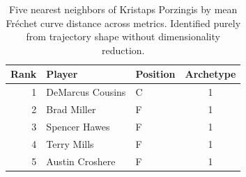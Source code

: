 \begin{table}[htbp]
  \centering\small
  \begin{tabular}{rllc}
    \toprule
    Rank & Player & Position & Archetype \\
    \midrule
    1 & DeMarcus Cousins & C & 1 \\
    2 & Brad Miller & F & 1 \\
    3 & Spencer Hawes & F & 1 \\
    4 & Terry Mills & F & 1 \\
    5 & Austin Croshere & F & 1 \\
    \bottomrule
  \end{tabular}
  \caption{Five nearest neighbors of Kristaps Porzingis by mean Fr\'{e}chet curve distance across metrics. Identified purely from trajectory shape without dimensionality reduction.}
  \label{tab:Kristaps_Porzingis_frechet_curve_neighbors}
\end{table}


